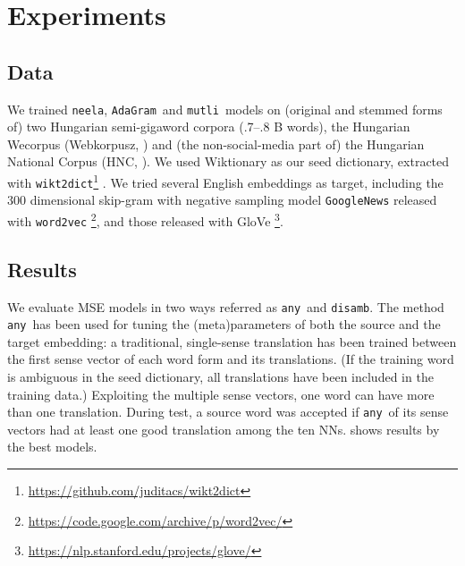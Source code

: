 \documentclass[11pt]{article}
\newcommand{\neelakantan}{\texttt{neela}}
\newcommand{\adagram}{\texttt{AdaGram}}
\newcommand{\mutli}{\texttt{mutli}}
\begin{document}

\section{Experiments}

\subsection{Data}

We trained \neelakantan, \adagram~and \mutli~models on (original and stemmed
forms of) two Hungarian semi-gigaword corpora (.7--.8 B words), the Hungarian
Wecorpus (Webkorpusz, \cite{Halacsy:2004}) and (the non-social-media part of) the
Hungarian National Corpus (HNC, \cite{Oravecz:2014}).  We used Wiktionary as our
seed dictionary, extracted with
\texttt{wikt2dict}\footnote{\url{https://github.com/juditacs/wikt2dict}}
\citep{Acs:2013}. We tried several English embeddings as target, including the
300 dimensional skip-gram with negative sampling model
\texttt{GoogleNews} released with \texttt{word2vec}
\citep{Mikolov:2013f}\footnote{\url{https://code.google.com/archive/p/word2vec/}},
and those released with GloVe
\citep{Pennington:2014}\footnote{\url{https://nlp.stanford.edu/projects/glove/}}.

\subsection{Results}

\newcommand{\any}{\texttt{any}}
\newcommand{\disamb}{\texttt{disamb}}

We evaluate MSE models in two ways referred as \any~and \disamb.  The method
\any~has been used for tuning the (meta)parameters of both the source and the
target embedding: a traditional, single-sense translation has been trained
between the first  sense vector of each word form and its
translations. (If the training word is ambiguous in the seed dictionary, all
translations have been included in the training data.)  Exploiting the multiple
sense vectors, one word can have more than one translation.  During test, a
source word was accepted if \any~of its sense vectors had at
least one good translation among the ten NNs.  shows results by
the best models.
\end{document}
